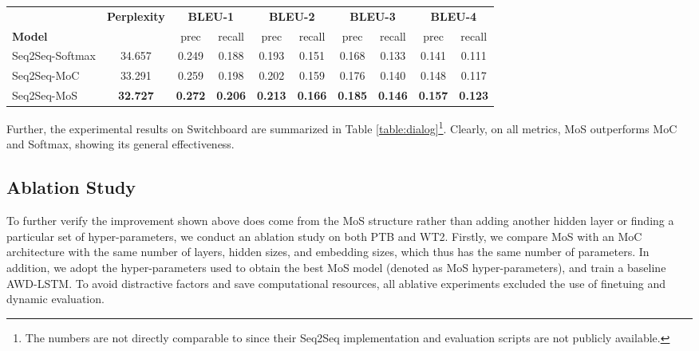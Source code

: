 \begin{table*}[t]%
	\small
	\centering
	\begin{tabular}{l|c|cc|cc|cc|cc}
		\toprule
		& \bf Perplexity & \multicolumn{2}{c|}{\bf BLEU-1} & \multicolumn{2}{c|}{\bf BLEU-2} & \multicolumn{2}{c|}{\bf BLEU-3} & \multicolumn{2}{c}{\bf BLEU-4} \\
		\bf Model & & prec & recall & prec & recall & prec & recall & prec & recall \\
		\midrule
		Seq2Seq-Softmax & 34.657 & 0.249 & 0.188 & 0.193 & 0.151 & 0.168 & 0.133& 0.141 & 0.111  \\
		Seq2Seq-MoC & 33.291 & 0.259 & 0.198 & 0.202 & 0.159 & 0.176 & 0.140 & 0.148 & 0.117  \\
		Seq2Seq-MoS & \bf 32.727 & \bf 0.272 & \bf 0.206 & \bf 0.213 & \bf 0.166 & \bf 0.185 & \bf 0.146 & \bf 0.157 & \bf 0.123 \\
		\bottomrule
	\end{tabular}
	\caption{\small
		Evaluation scores on Switchboard.
	}
	\label{table:dialog}
	\vspace{-1.5em}
\end{table*}
Further, the experimental results on Switchboard are summarized in Table \ref{table:dialog}\footnote{The numbers are not directly comparable to \cite{zhao2017learning} since their Seq2Seq implementation and evaluation scripts are not publicly available.}. Clearly, on all metrics, MoS outperforms MoC and Softmax, showing its general effectiveness.

\subsection{Ablation Study}

To further verify the improvement shown above does come from the MoS structure rather than adding another hidden layer or finding a particular set of hyper-parameters, we conduct an ablation study on both PTB and WT2. 
Firstly, we compare MoS with an MoC architecture with the same number of layers, hidden sizes, and embedding sizes, which thus has the same number of parameters.
In addition, we adopt the hyper-parameters used to obtain the best MoS model (denoted as MoS hyper-parameters), and train a baseline AWD-LSTM. 
To avoid distractive factors and save computational resources, all ablative experiments excluded the use of finetuing and dynamic evaluation.

